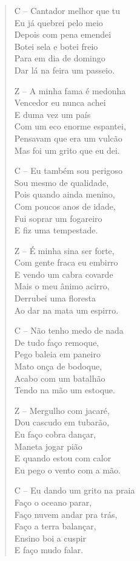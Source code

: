 \begin{verse}
C – Cantador melhor que tu\\
Eu já quebrei pelo meio\\
Depois com pena emendei\\
Botei sela e botei freio\\
Para em dia de domingo\\
Dar lá na feira um passeio.


Z – A minha fama é medonha\\
Vencedor eu nunca achei\\
E duma vez um país\\
Com um eco enorme espantei,\\
Pensavam que era um vulcão\\
Mas foi um grito que eu dei.

C – Eu também sou perigoso\\
Sou mesmo de qualidade,\\
Pois quando ainda menino,\\
Com poucos anos de idade,\\
Fui soprar um fogareiro\\
E fiz uma tempestade.

Z – É minha sina ser forte,\\
Com gente fraca eu embirro\\
E vendo um cabra covarde\\
Mais o meu ânimo acirro,\\
Derrubei uma floresta\\
Ao dar na mata um espirro.

C – Não tenho medo de nada\\
De tudo faço remoque,\\
Pego baleia em paneiro\\
Mato onça de bodoque,\\
Acabo com um batalhão\\
Tendo na mão um estoque.


Z – Mergulho com jacaré,\\
Dou cascudo em tubarão,\\
Eu faço cobra dançar,\\
Maneta jogar pião\\
E quando estou com calor\\
Eu pego o vento com a mão.

C – Eu dando um grito na praia\\
Faço o oceano parar,\\
Faço nuvem andar pra trás,\\
Faço a terra balançar,\\
Ensino boi a cuspir\\
E faço mudo falar.


\end{verse}

